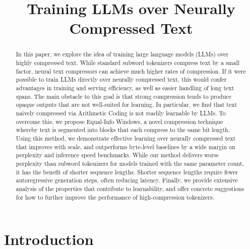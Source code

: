 \title{Training LLMs over Neurally Compressed Text}

\begin{abstract}
In this paper, we explore the idea of training large language models (LLMs) over highly compressed text. While standard subword tokenizers compress text by a small factor, neural text compressors can achieve much higher rates of compression. If it were possible to train LLMs directly over neurally compressed text, this would confer advantages in training and serving efficiency, as well as easier handling of long text spans. The main obstacle to this goal is that strong compression tends to produce opaque outputs that are not well-suited for learning. In particular, we find that text naïvely compressed via Arithmetic Coding is not readily learnable by LLMs. To overcome this, we propose Equal-Info Windows, a novel compression technique whereby text is segmented into blocks that each compress to the same bit length. Using this method, we demonstrate effective learning over neurally compressed text that improves with scale, and outperforms byte-level baselines by a wide margin on perplexity and inference speed benchmarks. While our method delivers worse perplexity than subword tokenizers for models trained with the same parameter count, it has the benefit of shorter sequence lengths. Shorter sequence lengths require fewer autoregressive generation steps, often reducing latency. Finally, we provide extensive analysis of the properties that contribute to learnability, and offer concrete suggestions for how to further improve the performance of high-compression tokenizers.
\end{abstract}

\section{Introduction}

